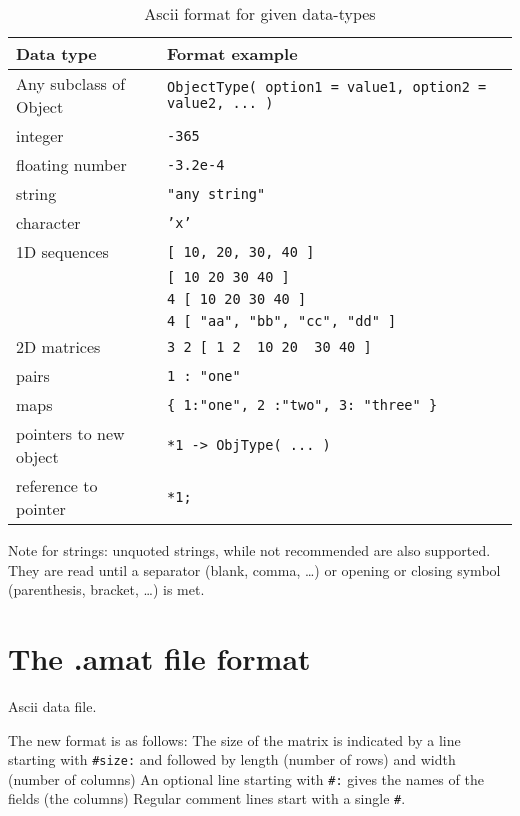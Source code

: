 \documentclass[11pt]{book}
\begin{document}
\begin{table}[h]
\caption{ Ascii format for given data-types }
\label{tab:ascii-format-ex}
\begin{tabular}{|l|l|} \hline 
{\bf Data type}         & {\bf Format example} \\ \hline
Any subclass of Object & {\tt ObjectType( option1 = value1, option2 = value2, ... )} \\ \hline
integer                 & {\tt -365} \\ \hline
floating number         & {\tt -3.2e-4} \\ \hline
string                  & {\tt "any string"} \\ \hline
character               & {\tt 'x'} \\ \hline
1D sequences            & {\tt [ 10, 20, 30, 40 ] } \\ 
                        & {\tt [ 10 20 30 40 ] } \\
                        & {\tt 4 [ 10 20 30 40 ] } \\ 
                        & {\tt 4 [ "aa", "bb", "cc", "dd" ] } \\ \hline
2D matrices             & \verb!3 2 [ 1 2  10 20  30 40 ]!    \\ \hline
pairs                   & {\tt 1 : "one" }  \\ \hline
maps                    & \verb!{ 1:"one", 2 :"two", 3: "three" }! \\ \hline
pointers to new object  & \verb!*1 -> ObjType( ... )! \\ \hline
reference to pointer    & \verb!*1;! \\ \hline
\end{tabular}
\begin{center}
\end{center}
\end{table}

Note for strings: unquoted strings, while not recommended are also supported. They are read until
a separator (blank, comma, \ldots) or opening or closing symbol (parenthesis, bracket, \ldots) is met.


\section{The .amat file format}

Ascii data file.

The new format is as follows:
The size of the matrix is indicated by a line starting with \verb!#size:! and followed by length (number of rows) and width (number of columns)
An optional line starting with \verb!#:! gives the names of the fields (the columns)
Regular comment lines start with a single \verb!#!.
\end{document}
